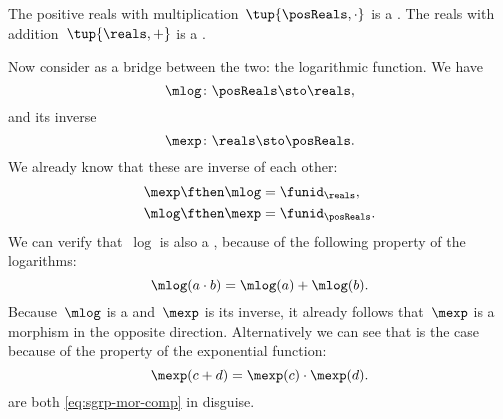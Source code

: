 \begin{example}
    The positive reals with multiplication~$\tup{\posReals, \cdot}$ is a .
    The reals with addition~$\tup{\reals, +}$ is a .

    Now consider as a bridge between the two: the logarithmic function.
    We have
    \begin{equation}
        \label{eq:log}
        \mlog \colon  \posReals \sto \reals,
    \end{equation}
    and its inverse
    \begin{equation}
        \label{eq:exp}
        \mexp \colon  \reals \sto \posReals.
    \end{equation}
    We already know that these are inverse of each other:
    \begin{equation}
        \label{eq:exp-log-are-inverses}
        \begin{aligned}
            \mexp \fthen \mlog & = \funid_{\reals}, \\
            \mlog \fthen \mexp & = \funid_{\posReals}.
        \end{aligned}
    \end{equation}
    We can verify that~$\log$ is also a , because of the following property of the logarithms:
    \begin{equation}
        \label{eq:log-property}
        \mlog(a \cdot b) = \mlog(a) + \mlog(b).
    \end{equation}
    Because~$\mlog$ is a  and~$\mexp$ is its inverse, it already follows that~$\mexp$ is a morphism in the opposite direction.
    Alternatively we can see that is the case because of the property of the exponential function:
    \begin{equation}
        \label{eq:exp-property}
        \mexp(c + d) = \mexp(c) \cdot \mexp(d).
    \end{equation}
     are both \cref{eq:sgrp-mor-comp} in disguise.
\end{example}

